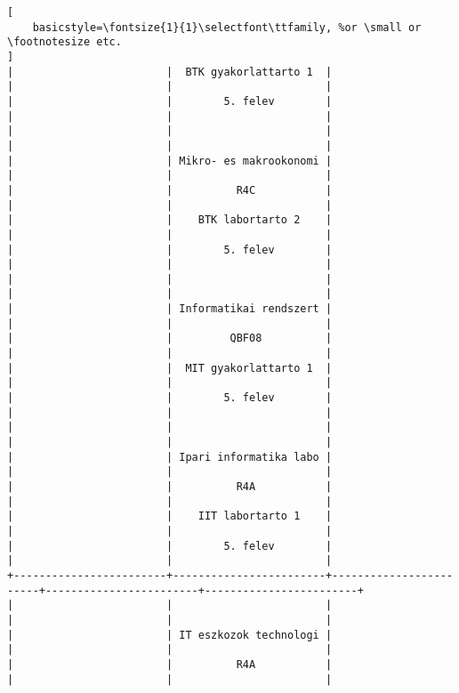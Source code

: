 \begin{lstlisting}[
    basicstyle=\fontsize{1}{1}\selectfont\ttfamily, %or \small or \footnotesize etc.
]
|                        |  BTK gyakorlattarto 1  |                        |                        |                        | 
|                        |        5. felev        |                        |                        |                        | 
|                        |                        |                        |                        |                        | 
|                        | Mikro- es makrookonomi |                        |                        |                        | 
|                        |          R4C           |                        |                        |                        | 
|                        |    BTK labortarto 2    |                        |                        |                        | 
|                        |        5. felev        |                        |                        |                        | 
|                        |                        |                        |                        |                        | 
|                        | Informatikai rendszert |                        |                        |                        | 
|                        |         QBF08          |                        |                        |                        | 
|                        |  MIT gyakorlattarto 1  |                        |                        |                        | 
|                        |        5. felev        |                        |                        |                        | 
|                        |                        |                        |                        |                        | 
|                        | Ipari informatika labo |                        |                        |                        | 
|                        |          R4A           |                        |                        |                        | 
|                        |    IIT labortarto 1    |                        |                        |                        | 
|                        |        5. felev        |                        |                        |                        | 
+------------------------+------------------------+------------------------+------------------------+------------------------+
|                        |                        |                        |                        |                        | 
|                        | IT eszkozok technologi |                        |                        |                        | 
|                        |          R4A           |                        |                        |                        | 

\end{lstlisting}
